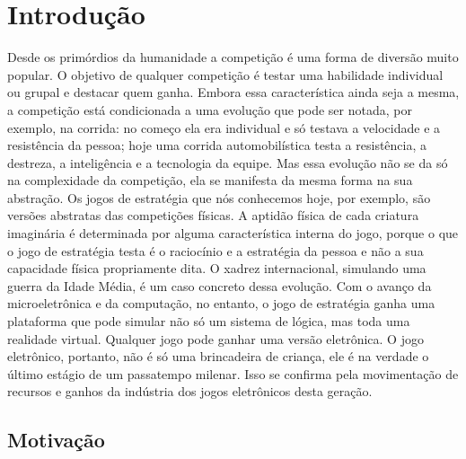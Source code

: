 \chapter{Introdução}
\label{cap:indtroducao}
%
Desde os primórdios da humanidade a competição é uma forma de diversão muito popular. O objetivo de qualquer competição é testar uma habilidade individual ou grupal e destacar quem ganha. Embora essa característica ainda seja a mesma, a competição está condicionada a uma evolução que pode ser notada, por exemplo, na corrida: no começo ela era individual e só testava a velocidade e a resistência da pessoa; hoje uma corrida automobilística testa a resistência, a destreza, a inteligência e a tecnologia da equipe.
Mas essa evolução não se da só na complexidade da competição, ela se manifesta da mesma forma na sua abstração. Os jogos de estratégia que nós conhecemos hoje, por exemplo, são versões abstratas das competições físicas. A aptidão física de cada criatura imaginária é determinada por alguma característica interna do jogo, porque o que o jogo de estratégia testa é o raciocínio e a estratégia da pessoa e não a sua capacidade física propriamente dita. O xadrez internacional, simulando uma guerra da Idade Média, é um caso concreto dessa evolução.
Com o avanço da microeletrônica e da computação, no entanto, o jogo de estratégia ganha uma plataforma que pode simular não só um sistema de lógica, mas toda uma realidade virtual. Qualquer jogo pode ganhar uma versão eletrônica. O jogo eletrônico, portanto, não é só uma brincadeira de criança, ele é na verdade o último estágio de um passatempo milenar. Isso se confirma pela movimentação de recursos e ganhos da indústria dos jogos eletrônicos desta geração.
%
%
\section{Motivação}
%
%
%
